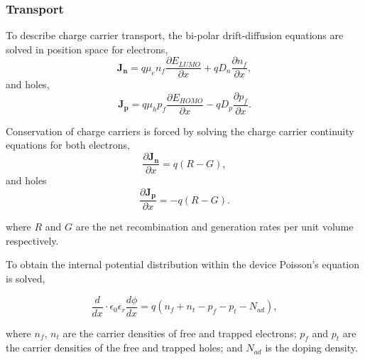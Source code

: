 \documentclass[11pt]{article}
\begin{document}
\subsubsection{Transport}
To describe charge carrier transport, the bi-polar drift-diffusion equations are solved in position space
for electrons,
\begin{equation}
\label{eq:ndrive}
\boldsymbol{J_n} = q \mu_e n_{f}  {\frac{\partial E_{LUMO}}{\partial x}}  + q D_n  {\frac{\partial n_{f}}{\partial x}},
\end{equation}
and holes,
\begin{equation}
\label{eq:pdrive}
\boldsymbol{J_p} = q \mu_h p_{f}  {\frac{\partial E_{HOMO}}{\partial x}}  - q D_p {\frac{\partial p_{f}}{\partial x}}.
\end{equation}

Conservation of charge carriers is forced by solving the charge carrier continuity equations for both electrons,
\begin{equation}
\label{eq:contn}
{\frac{\partial \boldsymbol{J_n}}{\partial x}}  = q (R-G),
\end{equation}
and holes
\begin{equation}
\label{eq:contp}
{\frac{\partial \boldsymbol{J_p}}{\partial x}} = - q (R-G).
\end{equation}

where $R$ and $G$ are the net recombination and generation rates per unit volume respectively.

To obtain the internal potential distribution within the device Poisson's equation is solved,

\begin{equation}
\label{eq:pos}
{\frac{d}{d x}} \cdot \epsilon_0 \epsilon_r {\frac{d \phi}{d x}} = q (n_{f}+n_{t}-p_{f}-p_{t}-N_{ad}),
\end{equation}

where $n_{f}$, $n_{t}$ are the carrier densities of free and trapped electrons; $p_{f}$ and $p_{t}$ are the carrier densities of the free and trapped holes; and $N_{ad}$ is the doping density.
\end{document}
